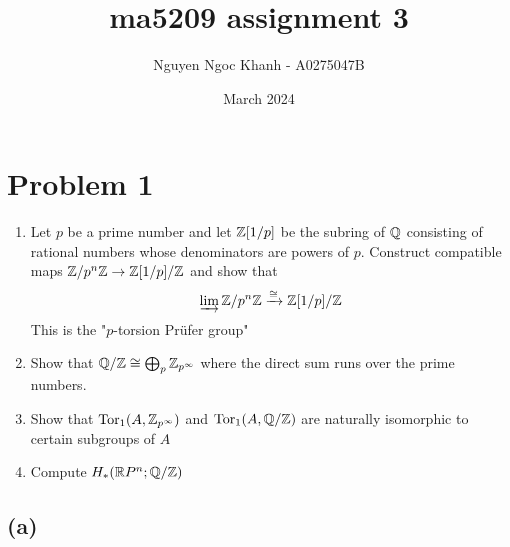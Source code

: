\documentclass{article}
\title{ma5209 assignment 3}
\author{Nguyen Ngoc Khanh - A0275047B}
\date{March 2024}
\begin{document}
\maketitle

\section{Problem 1}

\begin{enumerate}[label=(\alph*)]
    \item Let $p$ be a prime number and let $\mathbb{Z}[1/p]$ be the subring of $\mathbb{Q}$ consisting of rational numbers whose denominators are powers of $p$. Construct compatible maps $\mathbb{Z} / p^n \mathbb{Z} \to \mathbb{Z}[1/p]/\mathbb{Z}$ and show that
    $$
        \varinjlim \mathbb{Z} / p^n \mathbb{Z} \xrightarrow{\cong} \mathbb{Z}[1/p]/\mathbb{Z}
    $$
    This is the "$p$-torsion Prüfer group"

    \item Show that $\mathbb{Q} / \mathbb{Z} \cong \bigoplus_p \mathbb{Z}_{p^\infty}$ where the direct sum runs over the prime numbers.

    \item Show that $\operatorname{Tor}_1(A, \mathbb{Z}_{p^\infty})$ and $\operatorname{Tor}_1(A, \mathbb{Q} / \mathbb{Z})$ are naturally isomorphic to certain subgroups of $A$

    \item Compute $H_*(\mathbb{R} P^n; \mathbb{Q} / \mathbb{Z})$
\end{enumerate}

\subsection{(a)}

\begin{center}
\end{center}
\end{document}
